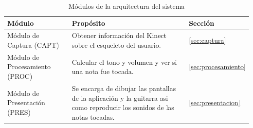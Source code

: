 \documentclass[a4paper,12pt]{article}
\begin{document}
\begin{table}[h]
        \centering
        \begin{tabularx}{\textwidth}{|p{3cm}| X |p{15mm}|}
                \hline
                \textbf{Módulo} & \textbf{Propósito} & \textbf{Sección} \\
                \hline
                Módulo de Captura (CAPT) & Obtener información del Kinect sobre el esqueleto del usuario. &\ref{sec:captura} \\
                \hline
                Módulo de Procesamiento (PROC) & Calcular el tono y volumen y ver si una nota fue tocada. &\ref{sec:procesamiento}\\
                \hline
                Módulo de Presentación (PRES) & Se encarga de dibujar las pantallas de la aplicación y la guitarra asi como reproducir los sonidos de las notas tocadas. &\ref{sec:presentacion}\\
                \hline
        \end{tabularx}
        \caption{Módulos de la arquitectura del sistema}
        \label{tab:modulos}
\end{table}
\end{document}
